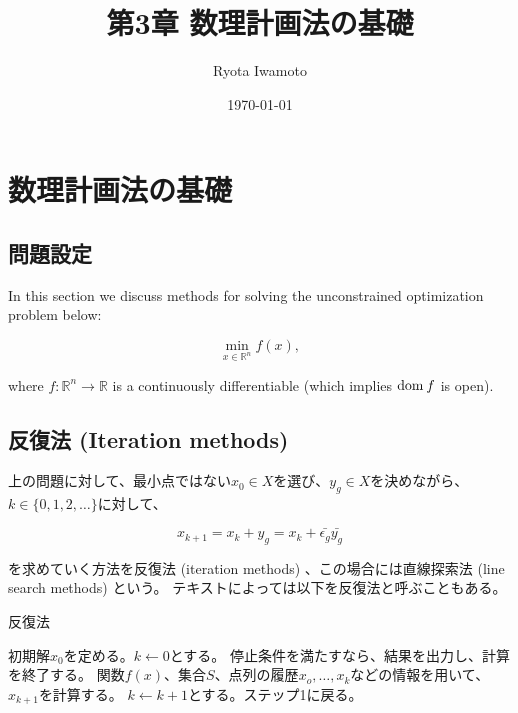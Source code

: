 \documentclass[a4paper,11pt]{jsarticle}
\theoremstyle{definition}
\newcommand{\RealNumberSet}{\mathbb{R}}
\newcommand{\Domain}[1]{\text{\rm dom\:${#1}$}} %
\begin{document}
\title{%
  第3章 数理計画法の基礎}
\author{Ryota Iwamoto}
\date{\today}
\maketitle

\section{数理計画法の基礎}

\subsection{問題設定}

In this section we discuss methods for solving the unconstrained optimization
problem below:

\begin{equation}
  \label{eq:unconstrained_optimization}
  \min_{x \in \RealNumberSet^n} f(x),
\end{equation}

where $f: \RealNumberSet^n \to \RealNumberSet$ is a continuously differentiable (which implies $\Domain{f}$ is open).

\subsection{反復法 (Iteration methods)}

上の問題に対して、最小点ではない$x_0 \in X$を選び、$y_{g} \in X$を決めながら、$k \in \{0, 1, 2, \ldots\}$に対して、

\begin{equation}
  \label{eq:iteration}
  x_{k+1} = x_k + y_{g} = x_k + \bar{\epsilon_{g}} \bar{y_{g}} \tag*{(3.2.1)}
\end{equation}

を求めていく方法を反復法 (iteration methods) 、この場合には直線探索法 (line search methods) という。
テキストによっては以下を反復法と呼ぶこともある。
\begin{algorithm}
  \caption{反復法}
  \label{alg:factorial}
  \begin{algorithmic}[1]
    \AlgInitialize 初期解$x_0$を定める。$k \leftarrow 0$とする。
    \State 停止条件を満たすなら、結果を出力し、計算を終了する。
    \State 関数$f(x)$、集合$S$、点列の履歴$x_o, \ldots, x_k$などの情報を用いて、$x_{k+1}$を計算する。
    \State $k \leftarrow k +1$とする。ステップ1に戻る。
  \end{algorithmic}
\end{algorithm}
\end{document}
